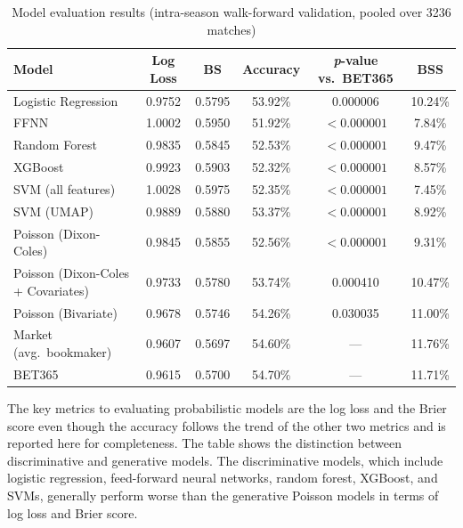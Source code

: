 \documentclass{article}
\begin{document}
\begin{table}[H]
\centering
\caption{Model evaluation results (intra-season walk-forward validation, pooled over 3236 matches)}
\label{tab:model_results}
\begin{tabular}{lccccc}
\toprule
\textbf{Model} & \textbf{Log Loss} & \textbf{BS} & \textbf{Accuracy} & \textbf{\textit{p}-value vs.\ BET365} & \textbf{BSS} \\
\midrule
Logistic Regression       & 0.9752 & 0.5795 & 53.92\% & 0.000006     & 10.24\% \\
FFNN                       & 1.0002 & 0.5950 & 51.92\% & $<0.000001$  & 7.84\% \\
Random Forest              & 0.9835 & 0.5845 & 52.53\% & $<0.000001$  & 9.47\% \\
XGBoost                    & 0.9923 & 0.5903 & 52.32\% & $<0.000001$  & 8.57\% \\
SVM (all features)         & 1.0028 & 0.5975 & 52.35\% & $<0.000001$  & 7.45\% \\
SVM (UMAP)                 & 0.9889 & 0.5880 & 53.37\% & $<0.000001$  & 8.92\% \\
\midrule
Poisson (Dixon-Coles)              & 0.9845 & 0.5855 & 52.56\% & $<0.000001$ & 9.31\% \\
Poisson (Dixon-Coles + Covariates) & 0.9733 & 0.5780 & 53.74\% & 0.000410    & 10.47\% \\
Poisson (Bivariate)                & 0.9678 & 0.5746 & 54.26\% & 0.030035    & 11.00\% \\
\midrule

\midrule
Market (avg.\ bookmaker)  & 0.9607 & 0.5697 & 54.60\%     & ---          & 11.76\% \\
BET365                     & 0.9615 & 0.5700 & 54.70\% & ---          & 11.71\% \\
\bottomrule
\end{tabular}
\end{table}


The key metrics to evaluating probabilistic models are the log loss and the Brier score even though the accuracy follows the trend of the other two metrics and is reported here for completeness. The table shows the distinction between discriminative and generative models. The discriminative models, which include logistic regression, feed-forward neural networks, random forest, XGBoost, and SVMs, generally perform worse than the generative Poisson models in terms of log loss and Brier score. 
\end{document}
